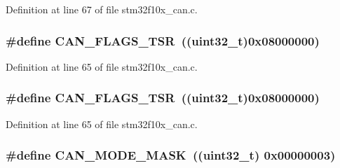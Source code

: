 Definition at line 67 of file stm32f10x\+\_\+can.\+c.

\subsubsection[{\texorpdfstring{C\+A\+N\+\_\+\+F\+L\+A\+G\+S\+\_\+\+T\+SR}{CAN_FLAGS_TSR}}]{\setlength{\rightskip}{0pt plus 5cm}\#define C\+A\+N\+\_\+\+F\+L\+A\+G\+S\+\_\+\+T\+SR~(({\bf uint32\+\_\+t})0x08000000)}\hypertarget{group___c_a_n___private___defines_gac67e7d905ba11441bf9e14180805cf3a}{}\label{group___c_a_n___private___defines_gac67e7d905ba11441bf9e14180805cf3a}


Definition at line 65 of file stm32f10x\+\_\+can.\+c.

\subsubsection[{\texorpdfstring{C\+A\+N\+\_\+\+F\+L\+A\+G\+S\+\_\+\+T\+SR}{CAN_FLAGS_TSR}}]{\setlength{\rightskip}{0pt plus 5cm}\#define C\+A\+N\+\_\+\+F\+L\+A\+G\+S\+\_\+\+T\+SR~(({\bf uint32\+\_\+t})0x08000000)}\hypertarget{group___c_a_n___private___defines_gac67e7d905ba11441bf9e14180805cf3a}{}\label{group___c_a_n___private___defines_gac67e7d905ba11441bf9e14180805cf3a}


Definition at line 65 of file stm32f10x\+\_\+can.\+c.

\subsubsection[{\texorpdfstring{C\+A\+N\+\_\+\+M\+O\+D\+E\+\_\+\+M\+A\+SK}{CAN_MODE_MASK}}]{\setlength{\rightskip}{0pt plus 5cm}\#define C\+A\+N\+\_\+\+M\+O\+D\+E\+\_\+\+M\+A\+SK~(({\bf uint32\+\_\+t}) 0x00000003)}\hypertarget{group___c_a_n___private___defines_ga79094ce5a3a2f717140e8cc9b7c161b6}{}\label{group___c_a_n___private___defines_ga79094ce5a3a2f717140e8cc9b7c161b6}



